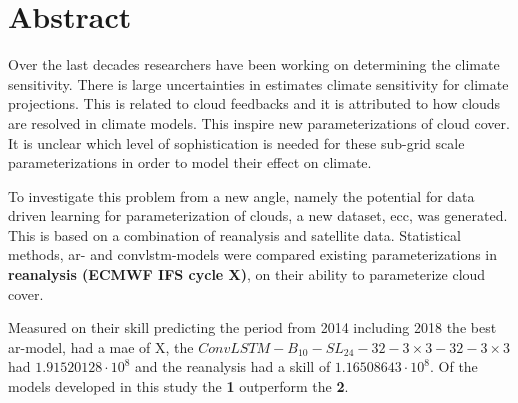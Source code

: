 \chapter*{Abstract}

Over the last decades researchers have been working on determining the climate sensitivity. 
There is large uncertainties in estimates climate sensitivity for climate projections. This is related to cloud feedbacks and it is attributed to how clouds are resolved in climate models. 
This inspire new parameterizations of cloud cover. It is unclear which level of sophistication is needed for these sub-grid scale parameterizations in order to model their effect on climate.

To investigate this problem from a new angle, namely the potential for data driven learning for parameterization of clouds, a new dataset, \acrfull{ecc}, was generated. This is based on a combination of reanalysis and satellite data. %
Statistical methods, \acrfull{ar}- and \acrfull{convlstm}-models were compared existing parameterizations in \textbf{reanalysis (ECMWF IFS cycle X)}, on their ability to parameterize cloud cover. 

Measured on their skill predicting the period
from 2014 including 2018 the best \acrshort{ar}-model, had a \acrshort{mae} of X,  the $ConvLSTM-B_{10}-SL_{24}-32-3\times3-32-3 \times3$ had $1.91520128 \cdot 10^8$ and the reanalysis had a skill of $1.16508643\cdot10^8$. Of the models developed in this study the \textbf{1} outperform the \textbf{2}.

